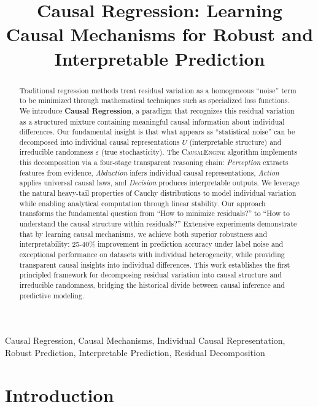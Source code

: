 \documentclass[conference]{IEEEtran}
\title{Causal Regression: Learning Causal Mechanisms for Robust and Interpretable Prediction}
\author{
\IEEEauthorblockN{Author Name}
\IEEEauthorblockA{
Department of Computer Science\\
University Name\\
Email: author@university.edu
}
\and
\IEEEauthorblockN{Coauthor Name}
\IEEEauthorblockA{
Department of Statistics\\
University Name\\
Email: coauthor@university.edu
}
}
\newcommand{\causalengine}{\textsc{CausalEngine}}
\begin{document}
\maketitle

\begin{abstract}
Traditional regression methods treat residual variation as a homogeneous ``noise'' term to be minimized through mathematical techniques such as specialized loss functions. We introduce \textbf{Causal Regression}, a paradigm that recognizes this residual variation as a structured mixture containing meaningful causal information about individual differences. Our fundamental insight is that what appears as ``statistical noise'' can be decomposed into individual causal representations $U$ (interpretable structure) and irreducible randomness $\varepsilon$ (true stochasticity). The \causalengine{} algorithm implements this decomposition via a four-stage transparent reasoning chain: \textit{Perception} extracts features from evidence, \textit{Abduction} infers individual causal representations, \textit{Action} applies universal causal laws, and \textit{Decision} produces interpretable outputs. We leverage the natural heavy-tail properties of Cauchy distributions to model individual variation while enabling analytical computation through linear stability. Our approach transforms the fundamental question from ``How to minimize residuals?'' to ``How to understand the causal structure within residuals?'' Extensive experiments demonstrate that by learning causal mechanisms, we achieve both superior robustness and interpretability: 25-40\% improvement in prediction accuracy under label noise and exceptional performance on datasets with individual heterogeneity, while providing transparent causal insights into individual differences. This work establishes the first principled framework for decomposing residual variation into causal structure and irreducible randomness, bridging the historical divide between causal inference and predictive modeling.
\end{abstract}

\begin{IEEEkeywords}
Causal Regression, Causal Mechanisms, Individual Causal Representation, Robust Prediction, Interpretable Prediction, Residual Decomposition
\end{IEEEkeywords}

\section{Introduction}
\label{sec:introduction}
\end{document}
